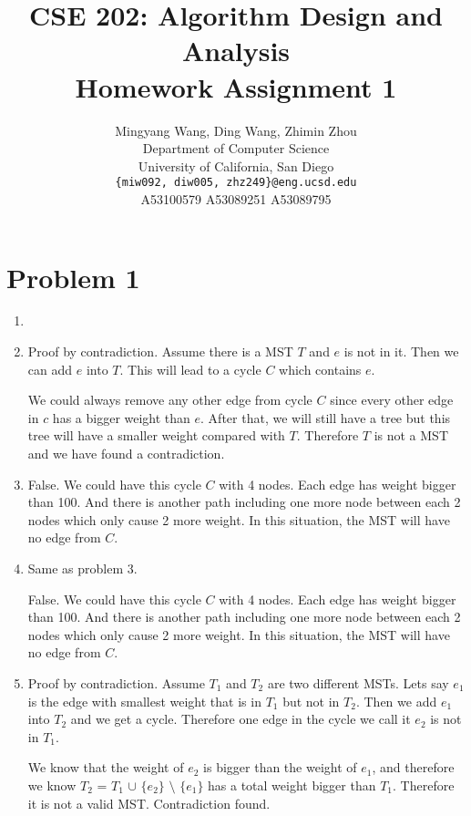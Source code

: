 \documentclass{article} %
\title{CSE 202: Algorithm Design and Analysis \\ Homework Assignment 1}
\author{
  Mingyang Wang, Ding Wang, Zhimin Zhou\\
  Department of Computer Science\\
  University of California, San Diego\\
  \texttt{\{miw092, diw005, zhz249\}@eng.ucsd.edu}\\
  A53100579 A53089251 A53089795\\
}
\begin{document}
\maketitle
\section*{Problem 1}

\begin{enumerate}
\item

\item 

  Proof by contradiction. Assume there is a MST $T$ and $e$ is not in it. Then
  we can add $e$ into $T$. This will lead to a cycle $C$ which contains $e$.

  We could always remove any other edge from cycle $C$ since every other edge in
  $c$ has a bigger weight than $e$. After that, we will still have a tree but this
  tree will have a smaller weight compared with $T$. Therefore $T$ is not a MST
  and we have found a contradiction.

\item

  False. We could have this cycle $C$ with 4 nodes. Each edge has weight bigger
  than 100. And there is another path including one more node between each 2 nodes
  which only cause 2 more weight. In this situation, the MST will have no edge
  from $C$.

\item

  Same as problem 3.

  False. We could have this cycle $C$ with 4 nodes. Each edge has weight bigger
  than 100. And there is another path including one more node between each 2 nodes
  which only cause 2 more weight. In this situation, the MST will have no edge
  from $C$.

\item

  Proof by contradiction. Assume $T_1$ and $T_2$ are two different MSTs. Lets
  say $e_1$ is the edge with smallest weight that is in $T_1$ but not in $T_2$.
  Then we add $e_1$ into $T_2$ and we get a cycle. Therefore one edge in the
  cycle we call it $e_2$ is not in $T_1$.

  We know that the weight of $e_2$ is bigger than the weight of $e_1$, and
  therefore we know $T_2$ = $T_1$ $\cup$ $\{e_2\}$ $\setminus$ $\{e_1\}$ has a
  total weight bigger than $T_1$. Therefore it is not a valid MST. Contradiction
  found.

\end{enumerate}
\end{document}

